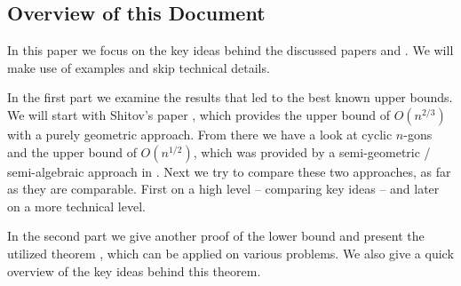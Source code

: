 \subsection{Overview of this Document}

In this paper we focus on the key ideas behind the discussed papers \cite{shitov2020sublinear} and \cite{kwan2020extension}. We will make use of examples and skip technical details.

In the first part we examine the results that led to the best known upper bounds.
We will start with Shitov's paper \cite{shitov2020sublinear}, which provides the upper bound of $O(n^{2/3})$ with a purely geometric approach.
From there we have a look at cyclic $n$-gons and the upper bound of $O(n^{1/2})$, which was provided by a semi-geometric / semi-algebraic approach in \cite{kwan2020extension}.
Next we try to compare these two approaches, as far as they are comparable. First on a high level -- comparing key ideas -- and later on a more technical level.

In the second part we give another proof of the lower bound and present the utilized theorem \cite[Theorem 1]{averkov2016maximum}, which can be applied on various problems. We also give a quick overview of the key ideas behind this theorem.
